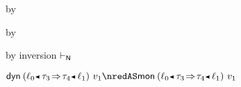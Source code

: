 {\begin{lamportproof*}
\begin{pfproof}
        \begin{pfproof}
          \absurdstep
            \begin{pfproof}
              by 
            \end{pfproof}
        \end{pfproof}
        \begin{pfproof}
          \absurdstep
            \begin{pfproof}
              by 
            \end{pfproof}
        \end{pfproof}
    \end{pfproof}

    \begin{pfproof}
        \begin{pfproof}
          by inversion $\vdash_{\mathsf{N}}$
        \end{pfproof}
        \begin{pfproof}
          \qedstep
            \begin{pfproof}
              $\edynb{\obnd{\sowner_0}{\tfun{\stype_3}{\stype_4}}{\sowner_1}}{\svalue_1} \nredAS \emon{\obnd{\sowner_0}{\tfun{\stype_3}{\stype_4}}{\sowner_1}}{\svalue_1}$
            \end{pfproof}
        \end{pfproof}
    \end{pfproof}

\end{lamportproof*}}

